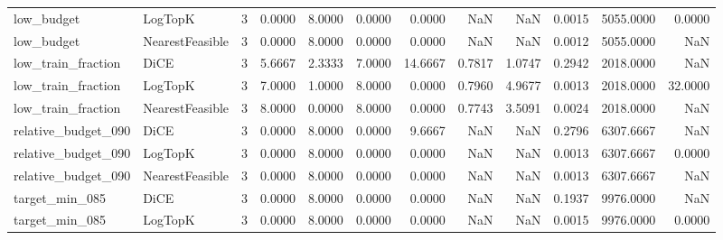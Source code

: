 \begin{tabular}{llrrrrrrrrrr}
          low\_budget &         LogTopK &      3 &            0.0000 &          8.0000 &          0.0000 &        0.0000 &                NaN &            NaN &       0.0015 &          5055.0000 &                0.0000 \\
          low\_budget & NearestFeasible &      3 &            0.0000 &          8.0000 &          0.0000 &        0.0000 &                NaN &            NaN &       0.0012 &          5055.0000 &                   NaN \\
  low\_train\_fraction &            DiCE &      3 &            5.6667 &          2.3333 &          7.0000 &       14.6667 &             0.7817 &         1.0747 &       0.2942 &          2018.0000 &                   NaN \\
  low\_train\_fraction &         LogTopK &      3 &            7.0000 &          1.0000 &          8.0000 &        0.0000 &             0.7960 &         4.9677 &       0.0013 &          2018.0000 &               32.0000 \\
  low\_train\_fraction & NearestFeasible &      3 &            8.0000 &          0.0000 &          8.0000 &        0.0000 &             0.7743 &         3.5091 &       0.0024 &          2018.0000 &                   NaN \\
 relative\_budget\_090 &            DiCE &      3 &            0.0000 &          8.0000 &          0.0000 &        9.6667 &                NaN &            NaN &       0.2796 &          6307.6667 &                   NaN \\
 relative\_budget\_090 &         LogTopK &      3 &            0.0000 &          8.0000 &          0.0000 &        0.0000 &                NaN &            NaN &       0.0013 &          6307.6667 &                0.0000 \\
 relative\_budget\_090 & NearestFeasible &      3 &            0.0000 &          8.0000 &          0.0000 &        0.0000 &                NaN &            NaN &       0.0013 &          6307.6667 &                   NaN \\
      target\_min\_085 &            DiCE &      3 &            0.0000 &          8.0000 &          0.0000 &        0.0000 &                NaN &            NaN &       0.1937 &          9976.0000 &                   NaN \\
      target\_min\_085 &         LogTopK &      3 &            0.0000 &          8.0000 &          0.0000 &        0.0000 &                NaN &            NaN &       0.0015 &          9976.0000 &                0.0000 \\

\end{tabular}
